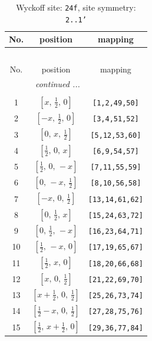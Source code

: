 \documentclass[fleqn,8pt]{jsarticle}
\begin{document}
\begin{longtable}{ccc}
\caption{Wyckoff site: {\tt 24f}, site symmetry: {\tt 2..1'}}
 \\
 \hline \hline
No. & position & mapping \\ \hline \endfirsthead

\multicolumn{2}{l}{\tablename\ \thetable{}} \\
 \hline \hline
No. & position & mapping \\ \hline \endhead

 \hline \hline
\multicolumn{2}{r}{\footnotesize\it continued ...} \\ \endfoot

 \hline \hline
\multicolumn{2}{r}{} \\ \endlastfoot

1 & $\left[ x,\, \frac{1}{2},\, 0 \right]$ & {\tt [1,2,49,50]} \\ \hline
2 & $\left[ - x,\, \frac{1}{2},\, 0 \right]$ & {\tt [3,4,51,52]} \\ \hline
3 & $\left[ 0,\, x,\, \frac{1}{2} \right]$ & {\tt [5,12,53,60]} \\ \hline
4 & $\left[ \frac{1}{2},\, 0,\, x \right]$ & {\tt [6,9,54,57]} \\ \hline
5 & $\left[ \frac{1}{2},\, 0,\, - x \right]$ & {\tt [7,11,55,59]} \\ \hline
6 & $\left[ 0,\, - x,\, \frac{1}{2} \right]$ & {\tt [8,10,56,58]} \\ \hline
7 & $\left[ - x,\, 0,\, \frac{1}{2} \right]$ & {\tt [13,14,61,62]} \\ \hline
8 & $\left[ 0,\, \frac{1}{2},\, x \right]$ & {\tt [15,24,63,72]} \\ \hline
9 & $\left[ 0,\, \frac{1}{2},\, - x \right]$ & {\tt [16,23,64,71]} \\ \hline
10 & $\left[ \frac{1}{2},\, - x,\, 0 \right]$ & {\tt [17,19,65,67]} \\ \hline
11 & $\left[ \frac{1}{2},\, x,\, 0 \right]$ & {\tt [18,20,66,68]} \\ \hline
12 & $\left[ x,\, 0,\, \frac{1}{2} \right]$ & {\tt [21,22,69,70]} \\ \hline
13 & $\left[ x + \frac{1}{2},\, 0,\, \frac{1}{2} \right]$ & {\tt [25,26,73,74]} \\ \hline
14 & $\left[ \frac{1}{2} - x,\, 0,\, \frac{1}{2} \right]$ & {\tt [27,28,75,76]} \\ \hline
15 & $\left[ \frac{1}{2},\, x + \frac{1}{2},\, 0 \right]$ & {\tt [29,36,77,84]} \\ \hline

\end{longtable}
\end{document}
